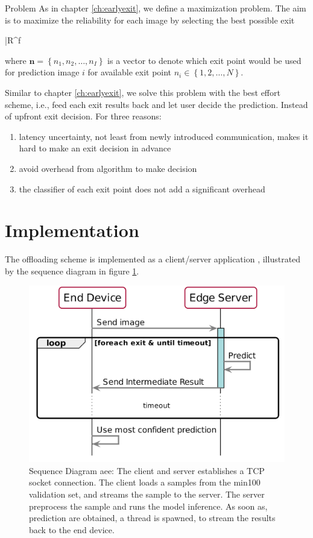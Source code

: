 \begin{enumdescript}
		\item[Problem] As in chapter \ref{ch:earlyexit}, we define a maximization problem. The aim is to maximize the reliability for each image by selecting the best possible exit
		\begin{maxi}
			{}{\bar{R}^f}
			{}{}
		\end{maxi}
		where $ \bm{n} = \left\{ n_1, n_2, \dots, n_I \right\}$ is a vector to denote which exit point would be used for prediction image $ i $ for available exit point $ n_i \in \left\{1,2, \dots, N\right\} $.
		
		Similar to chapter \ref{ch:earlyexit}, we solve this problem with the best effort scheme, i.e., feed each exit results back and let user decide the prediction. Instead of upfront exit decision. For three reasons:
		\begin{enumerate}
			\item latency uncertainty, not least from newly introduced communication, makes it hard to make an exit decision in advance
			\item avoid overhead from algorithm to make decision
			\item the classifier of each exit point does not add a significant overhead
		\end{enumerate}
		
			
	\end{enumdescript}  

\section{Implementation} \label{sec:edge-implementation}

The offloading scheme is implemented as a client/server application \cite{sommerville_software_2015}, illustrated by the sequence diagram in figure \ref{fig:sequence-diagram}. 

\begin{figure}
	\captionsetup[subfigure]{justification=centering}
	\centering
	\includegraphics[width=.7\linewidth]{figures/models/sequence_diagram}
	\caption[Sequence Diagram \acrshort{aee}]{Sequence Diagram \acrshort{aee}: The client and server establishes a TCP socket connection. The client loads a samples from the \gls{min100} validation set, and streams the sample to the server. The server preprocess the sample and runs the model inference. As soon as, prediction are obtained, a thread is spawned, to stream the results back to the end device. }
	\label{fig:sequence-diagram}
\end{figure}

